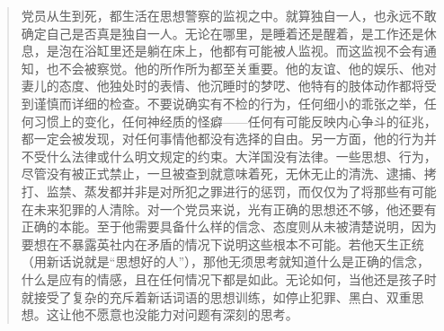 \begin{paracol}{2}
\begin{quotation}
\switchcolumn

党员从生到死，都生活在思想警察的监视之中。就算独自一人，也永远不敢确定自己是否真是独自一人。无论在哪里，是睡着还是醒着，是工作还是休息，是泡在浴缸里还是躺在床上，他都有可能被人监视。而这监视不会有通知，也不会被察觉。他的所作所为都至关重要。他的友谊、他的娱乐、他对妻儿的态度、他独处时的表情、他沉睡时的梦呓、他特有的肢体动作都将受到谨慎而详细的检查。不要说确实有不检的行为，任何细小的乖张之举，任何习惯上的变化，任何神经质的怪癖——任何有可能反映内心争斗的征兆，都一定会被发现，对任何事情他都没有选择的自由。另一方面，他的行为并不受什么法律或什么明文规定的约束。大洋国没有法律。一些思想、行为，尽管没有被正式禁止，一旦被查到就意味着死，无休无止的清洗、逮捕、拷打、监禁、蒸发都并非是对所犯之罪进行的惩罚，而仅仅为了将那些有可能在未来犯罪的人清除。对一个党员来说，光有正确的思想还不够，他还要有正确的本能。至于他需要具备什么样的信念、态度则从未被清楚说明，因为要想在不暴露英社内在矛盾的情况下说明这些根本不可能。若他天生正统（用新话说就是``思想好的人''），那他无须思考就知道什么是正确的信念，什么是应有的情感，且在任何情况下都是如此。无论如何，当他还是孩子时就接受了复杂的充斥着新话词语的思想训练，如停止犯罪、黑白、双重思想。这让他不愿意也没能力对问题有深刻的思考。

\switchcolumn*


\end{quotation}
\end{paracol}
